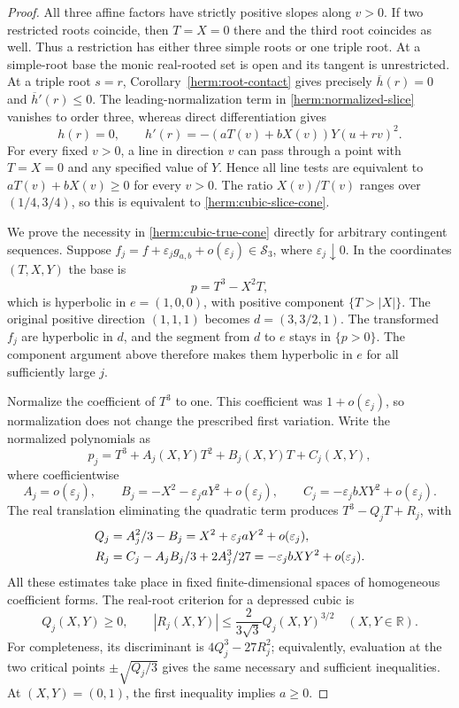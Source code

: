 \documentclass[reqno]{amsart}
\theoremstyle{definition}
\theoremstyle{remark}
\newcommand{\R}{\mathbb R}
\begin{document}
\begin{proof}
All three affine factors have strictly positive slopes along $v>0$.
If two restricted roots coincide, then $T=X=0$ there and the third
root coincides as well.  Thus a restriction has either three simple
roots or one triple root.  At a simple-root base the monic real-rooted
set is open and its tangent is unrestricted.  At a triple root $s=r$,
Corollary~\ref{herm:root-contact} gives precisely
$\overline h(r)=0$ and $\overline h'(r)\leq0$.
The leading-normalization term in \eqref{herm:normalized-slice}
vanishes to order three, whereas direct differentiation gives
\[
 h(r)=0,\qquad
 h'(r)=-(aT(v)+bX(v))Y(u+rv)^2.
\]
For every fixed $v>0$, a line in direction $v$ can pass through a point
with $T=X=0$ and any specified value of $Y$.  Hence all line tests are
equivalent to $aT(v)+bX(v)\geq0$ for every $v>0$.
The ratio $X(v)/T(v)$ ranges over $(1/4,3/4)$, so this is equivalent
to \eqref{herm:cubic-slice-cone}.

We prove the necessity in \eqref{herm:cubic-true-cone} directly for
arbitrary contingent sequences.  Suppose
$f_j=f+\varepsilon_jg_{a,b}+o(\varepsilon_j)\in\mathcal S_3$, where
$\varepsilon_j\downarrow0$.  In the coordinates $(T,X,Y)$ the base is
\[
 p=T^3-X^2T,
\]
which is hyperbolic in $e=(1,0,0)$, with positive component
$\{T>|X|\}$.  The original positive direction $(1,1,1)$ becomes
$d=(3,3/2,1)$.  The transformed $f_j$ are hyperbolic in $d$, and the
segment from $d$ to $e$ stays in $\{p>0\}$.  The component argument
above therefore makes them hyperbolic in $e$ for all sufficiently
large $j$.

Normalize the coefficient of $T^3$ to one.  This coefficient was
$1+o(\varepsilon_j)$, so normalization does not change the prescribed
first variation.  Write the normalized polynomials as
\[
 p_j=T^3+A_j(X,Y)T^2+B_j(X,Y)T+C_j(X,Y),
\]
where coefficientwise
\[
 A_j=o(\varepsilon_j),\qquad
 B_j=-X^2-\varepsilon_j aY^2+o(\varepsilon_j),\qquad
 C_j=-\varepsilon_j bXY^2+o(\varepsilon_j).
\]
The real translation eliminating the quadratic term produces
$T^3-Q_jT+R_j$, with
\begin{align}
 Q_j&=A_j^2/3-B_j
       =X^2+\varepsilon_j aY^2+o(\varepsilon_j),\notag\\
 R_j&=C_j-A_jB_j/3+2A_j^3/27
       =-\varepsilon_j bXY^2+o(\varepsilon_j).
 \label{herm:cubic-depressed}
\end{align}
All these estimates take place in fixed finite-dimensional spaces of
homogeneous coefficient forms.  The real-root criterion for a depressed
cubic is
\begin{equation}
 Q_j(X,Y)\geq0,\qquad
 |R_j(X,Y)|\leq\frac{2}{3\sqrt3}Q_j(X,Y)^{3/2}
       \quad(X,Y\in\R).
 \label{herm:cubic-discriminant-bound}
\end{equation}
For completeness, its discriminant is $4Q_j^3-27R_j^2$; equivalently,
evaluation at the two critical points
$\pm\sqrt{Q_j/3}$ gives the same necessary and sufficient inequalities.
At $(X,Y)=(0,1)$, the first inequality implies $a\geq0$.


\end{proof}
\end{document}
